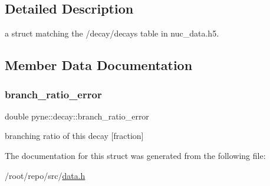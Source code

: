 \subsection{Detailed Description}
a struct matching the \textquotesingle{}/decay/decays\textquotesingle{} table in nuc\+\_\+data.\+h5. 

\subsection{Member Data Documentation}
\mbox{\label{structpyne_1_1decay_a6df2be5724d68bfe566b53fa71320812}} 
\subsubsection{\texorpdfstring{branch\+\_\+ratio\+\_\+error}{branch\_ratio\_error}}
{\footnotesize\ttfamily double pyne\+::decay\+::branch\+\_\+ratio\+\_\+error}

branching ratio of this decay \mbox{[}fraction\mbox{]} 

The documentation for this struct was generated from the following file\+:\begin{DoxyCompactItemize}
\item 
/root/repo/src/\hyperlink{data_8h}{data.\+h}\end{DoxyCompactItemize}
